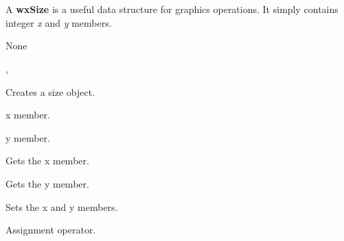 \section{}\label{wxsize}

A {\bf wxSize} is a useful data structure for graphics operations.
It simply contains integer {\it x} and {\it y} members.


None


, 





Creates a size object.



x member.



y member.

\label{wxsizegetx}


Gets the x member.

\label{wxsizegety}


Gets the y member.

\label{wxsizeset}


Sets the x and y members.



Assignment operator.


